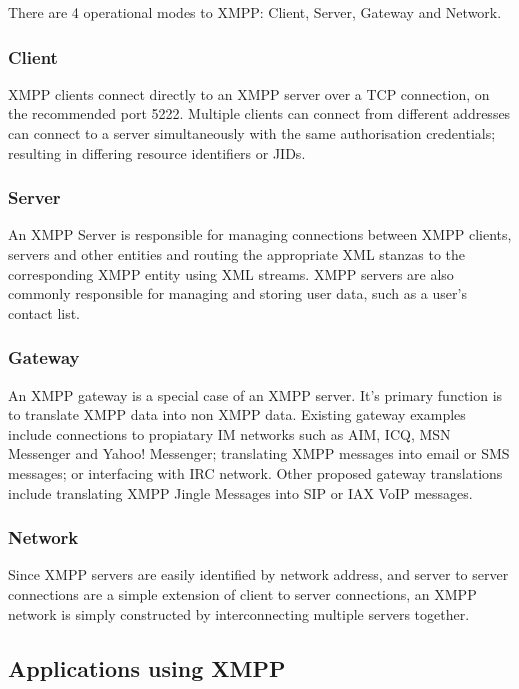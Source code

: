 There are 4 operational modes to XMPP: Client, Server, Gateway and
Network.

\subsubsection{Client}

XMPP clients connect directly to an XMPP server over a TCP connection,
on the recommended port 5222. Multiple clients can connect from 
different addresses can connect to a server simultaneously with the same 
authorisation credentials; resulting in differing resource identifiers
or JIDs.

\subsubsection{Server}

An XMPP Server is responsible for managing connections between XMPP
clients, servers and other entities and routing the appropriate XML stanzas
to the corresponding XMPP entity using XML streams. XMPP servers are
also commonly responsible for managing and storing user data, such as a
user's contact list.

\subsubsection{Gateway}

An XMPP gateway is a special case of an XMPP server. It's primary
function is to translate XMPP data into non XMPP data. Existing gateway 
examples include connections to propiatary IM networks such as AIM, ICQ,
MSN Messenger and Yahoo! Messenger; translating XMPP messages into email 
or SMS messages; or interfacing with IRC network. Other proposed gateway
translations include translating XMPP Jingle Messages into SIP or IAX
VoIP messages.

\subsubsection{Network}

Since XMPP servers are easily identified by network address, and server
to server connections are a simple extension of client to server
connections, an XMPP network is simply constructed by interconnecting
multiple servers together.

\subsection{Applications using XMPP}

